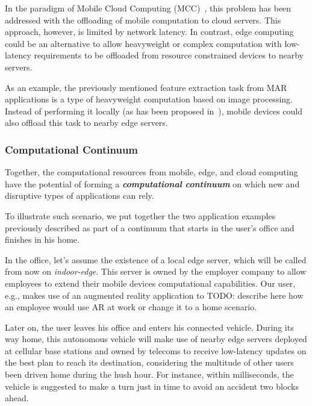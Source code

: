 In the paradigm of Mobile Cloud Computing (MCC)~\cite{}, this problem has been addressed with the offloading of mobile computation to cloud servers. This approach, however, is limited by network latency. In contrast, edge computing could be an alternative to allow heavyweight or complex computation with low-latency requirements to be offloaded from resource constrained devices to nearby servers.


As an example, the previously mentioned feature extraction task from MAR applications is a type of heavyweight computation based on image processing. Instead of performing it locally (as has been proposed in~\cite{}), mobile devices could also offload this task to nearby edge servers. 

\subsubsection{Computational Continuum}

Together, the computational resources from mobile, edge, and cloud computing have the potential of forming a \textit{\textbf{computational continuum}} on which new and disruptive types of applications can rely. 

To illustrate such scenario, we put together the two application examples previously described as part of a continuum that starts in the user's office and finishes in his home. 

In the office, let's assume the existence of a local edge server, which will be called from now on \textit{indoor-edge}. This server is owned by the employer company to allow employees to extend their mobile devices computational capabilities. Our user, e.g., makes use of an augmented reality application to TODO: describe here how an employee would use AR at work or change it to a home scenario.

Later on, the user leaves his office and enters his connected vehicle. During its way home, this autonomous vehicle will make use of nearby edge servers deployed at cellular base stations and owned by telecoms to receive low-latency updates on the best plan to reach its destination, considering the multitude of other users been driven home during the hush hour. For instance, within milliseconds, the vehicle is suggested to make a turn just in time to avoid an accident two blocks ahead. 

